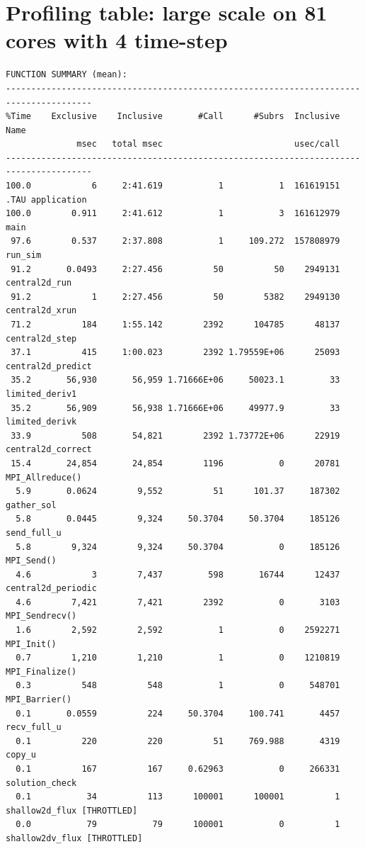 \documentclass{article}
\begin{document}
\section{Profiling table: large scale on 81 cores with 4 time-step}
\noindent
{\footnotesize
\begin{verbatim}
FUNCTION SUMMARY (mean):
---------------------------------------------------------------------------------------
%Time    Exclusive    Inclusive       #Call      #Subrs  Inclusive Name
              msec   total msec                          usec/call 
---------------------------------------------------------------------------------------
100.0            6     2:41.619           1           1  161619151 .TAU application
100.0        0.911     2:41.612           1           3  161612979 main 
 97.6        0.537     2:37.808           1     109.272  157808979 run_sim 
 91.2       0.0493     2:27.456          50          50    2949131 central2d_run 
 91.2            1     2:27.456          50        5382    2949130 central2d_xrun 
 71.2          184     1:55.142        2392      104785      48137 central2d_step 
 37.1          415     1:00.023        2392 1.79559E+06      25093 central2d_predict 
 35.2       56,930       56,959 1.71666E+06     50023.1         33 limited_deriv1 
 35.2       56,909       56,938 1.71666E+06     49977.9         33 limited_derivk 
 33.9          508       54,821        2392 1.73772E+06      22919 central2d_correct 
 15.4       24,854       24,854        1196           0      20781 MPI_Allreduce() 
  5.9       0.0624        9,552          51      101.37     187302 gather_sol 
  5.8       0.0445        9,324     50.3704     50.3704     185126 send_full_u 
  5.8        9,324        9,324     50.3704           0     185126 MPI_Send() 
  4.6            3        7,437         598       16744      12437 central2d_periodic 
  4.6        7,421        7,421        2392           0       3103 MPI_Sendrecv() 
  1.6        2,592        2,592           1           0    2592271 MPI_Init() 
  0.7        1,210        1,210           1           0    1210819 MPI_Finalize() 
  0.3          548          548           1           0     548701 MPI_Barrier() 
  0.1       0.0559          224     50.3704     100.741       4457 recv_full_u 
  0.1          220          220          51     769.988       4319 copy_u 
  0.1          167          167     0.62963           0     266331 solution_check 
  0.1           34          113      100001      100001          1 shallow2d_flux [THROTTLED]
  0.0           79           79      100001           0          1 shallow2dv_flux [THROTTLED]

\end{verbatim}}
\end{document}
